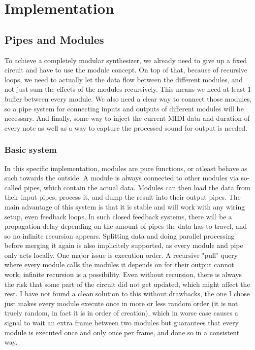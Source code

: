 \documentclass[11pt,a4paper]{article}
\begin{document}
\section{Implementation}

\subsection{Pipes and Modules}

To achieve a completely modular synthesizer, we already need to give up a fixed circuit and have to use the module concept. On top of that, because of recursive loops, we need to actually let the data flow between the different modules, and not just sum the effects of the modules recursively. This means we need at least 1 buffer between every module. We also need a clear way to connect those modules, so a pipe system for connecting inputs and outputs of different modules will be necessary. And finally, some way to inject the current MIDI data and duration of every note as well as a way to capture the processed sound for output is needed.

\subsubsection{Basic system}

In this specific implementation, modules are pure functions, or atleast behave as such towards the outside. A module is always connected to other modules via so-called pipes, which contain the actual data. Modules can then load the data from their input pipes, process it, and dump the result into their output pipes. The main advantage of this system is that it is stable and will work with any wiring setup, even feedback loops. In such closed feedback systems, there will be a propagation delay depending on the amount of pipes the data has to travel, and so no infinite recursion appears. Splitting data and doing parallel processing before merging it again is also implicitely supported, as every module and pipe only acts locally.
One major issue is execution order. A recursive "pull" query where every module calls the modules it depends on for their output cannot work, infinite recursion is a possibility. Even without recursion, there is always the risk that some part of the circuit did not get updated, which might affect the rest. I have not found a clean solution to this without drawbacks, the one I chose just makes every module execute once in more or less random order (it is not truely random, in fact it is in order of creation), which in worse case causes a signal to wait an extra frame between two modules but guarantees that every module is executed once and only once per frame, and done so in a consistent way.
\end{document}
